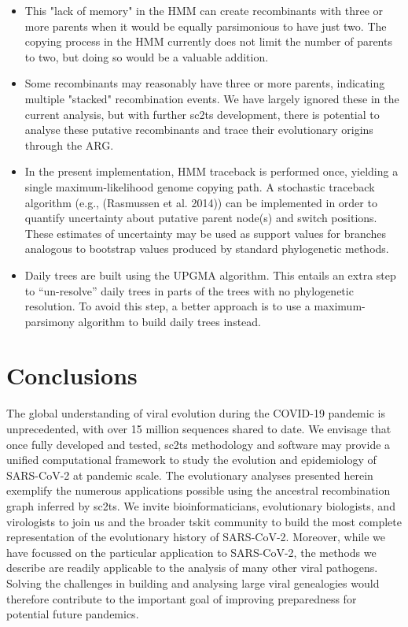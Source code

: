 \documentclass{article}
\begin{document}
\begin{itemize}
\item This "lack of memory" in the HMM can create
recombinants with three or more parents when it would be equally parsimonious
to have just two. The copying process in the HMM currently does not limit the
number of parents to two, but doing so would be a valuable addition.
\item Some
recombinants may reasonably have three or more parents, indicating multiple
"stacked" recombination events. We have largely ignored these in the current
analysis, but with further sc2ts development, there is potential to analyse
these putative recombinants and trace their evolutionary origins through the
ARG.
\item In the present implementation, HMM traceback is performed once,
yielding a single maximum-likelihood genome copying path. A stochastic
traceback algorithm (e.g., (Rasmussen et al. 2014)) can be implemented in order
to quantify uncertainty about putative parent node(s) and switch positions.
These estimates of uncertainty may be used as support values for branches
analogous to bootstrap values produced by standard phylogenetic methods.
\item
Daily trees are built using the UPGMA algorithm. This entails an extra step to
``un-resolve'' daily trees in parts of the trees with no phylogenetic resolution.
To avoid this step, a better approach is to use a maximum-parsimony algorithm
to build daily trees instead.
\end{itemize}

\section{Conclusions}

The global understanding of viral evolution during the COVID-19 pandemic is
unprecedented, with over 15 million sequences shared to date. We envisage that
once fully developed and tested, sc2ts methodology and software may provide a
unified computational framework to study the evolution and epidemiology of
SARS-CoV-2 at pandemic scale. The evolutionary analyses presented herein
exemplify the numerous applications possible using the ancestral recombination
graph inferred by sc2ts. We invite bioinformaticians, evolutionary biologists,
and virologists to join us and the broader tskit community to build the most
complete representation of the evolutionary history of SARS-CoV-2. Moreover,
while we have focussed on the particular application to SARS-CoV-2, the methods
we describe are readily applicable to the analysis of many other viral
pathogens. Solving the challenges in building and analysing large viral
genealogies would therefore contribute to the important goal of improving
preparedness for potential future pandemics.
\end{document}
